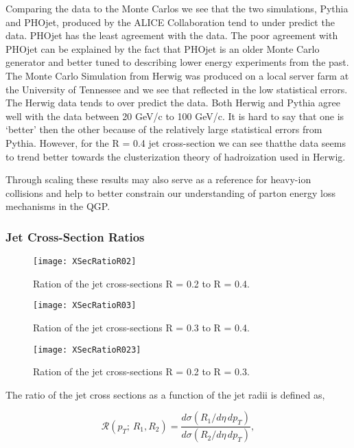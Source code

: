 Comparing the data to the Monte Carlos we see that the two simulations, Pythia and PHOjet, produced by the ALICE Collaboration tend to under predict the data.  PHOjet has the least agreement with the data.  The poor agreement with PHOjet can be explained by the fact that PHOjet is an older Monte Carlo generator and better tuned to describing lower energy experiments from the past.  The Monte Carlo Simulation from Herwig was produced on a local server farm at the University of Tennessee and we see that reflected in the low statistical errors.  The Herwig data tends to over predict the data.  Both Herwig and Pythia agree well with the data between 20 GeV/c to 100 GeV/c.  It is hard to say that one is `better' then the other because of the relatively large statistical errors from Pythia.  However, for the R = 0.4 jet cross-section we can see thatthe data seems to trend better towards the clusterization theory of hadroization used in Herwig.

Through scaling these results may also serve as a reference for heavy-ion collisions and help to better constrain our understanding of parton energy loss mechanisms in the QGP.  


\subsubsection{Jet Cross-Section Ratios}

\begin{figure}[h]
\texttt{[image: XSecRatioR02]}
\centering
\caption{Ration of the jet cross-sections R = 0.2  to R = 0.4.}
\label{fig:JetXsecRatioR02}
\end{figure}

\begin{figure}[h]
\texttt{[image: XSecRatioR03]}
\centering
\caption{Ration of the jet cross-sections R = 0.3  to R = 0.4.}
\label{fig:JetXsecRatioR03}
\end{figure}


\begin{figure}[h]
\texttt{[image: XSecRatioR023]}
\centering
\caption{Ration of the jet cross-sections R = 0.2  to R = 0.3.}
\label{fig:JetXsecRatioR023}
\end{figure}


\newpage

The ratio of the jet cross sections as a function of the jet radii is defined as,

\begin{equation}
\mathscr{R} (p_{T}; \, R_{1},R_{2}) = \frac{d\sigma(R_{1} /d\eta \, dp_{T}) }{d\sigma (R_{2} /d\eta \, dp_{T})},
\label{eq:jetxsecratio}
\end{equation}


